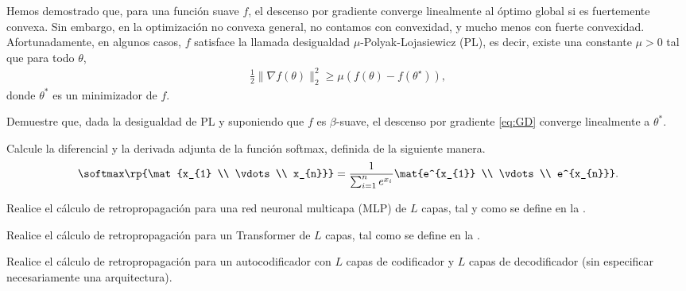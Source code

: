 \documentclass[../../book-main_es.tex]{subfiles}
\begin{document}
\begin{exercise}
    Hemos demostrado que, para una función suave $f$, el descenso por gradiente
    converge linealmente al óptimo global si es fuertemente
    convexa. Sin embargo, en la optimización no convexa general, no
    contamos con convexidad, y mucho menos con fuerte convexidad. Afortunadamente, en algunos
    casos, $f$ satisface la llamada desigualdad $\mu$-Polyak-Lojasiewicz (PL),
    es decir, existe una constante $\mu > 0$ tal que para
    todo $\theta$,
    \begin{align*}
        \frac{1}{2}\|\nabla f(\theta)\|_2^2 \ge \mu\left( f(\theta) -
        f(\theta^\star) \right),
    \end{align*}
    donde $\theta^*$ es un minimizador de $f$.

    Demuestre que, dada la desigualdad de PL y suponiendo que
    $f$ es $\beta$-suave, el descenso por gradiente \eqref{eq:GD} converge
    linealmente a  $\theta^*$.
\end{exercise}

\begin{exercise}
    Calcule la diferencial y la derivada adjunta de la función softmax,
    definida de la siguiente manera.
    \begin{equation}
        \softmax\rp{\mat{x_{1} \\ \vdots \\ x_{n}}} =
        \frac{1}{\sum_{i = 1}^{n}e^{x_{i}}}\mat{e^{x_{1}} \\ \vdots \\ e^{x_{n}}}.
    \end{equation}
\end{exercise}

\begin{exercise}
    Realice el cálculo de retropropagación para una red neuronal multicapa (MLP) de \(L\) capas,
    tal y como se define en la .
\end{exercise}

\begin{exercise}
    Realice el cálculo de retropropagación para un Transformer de \(L\) capas,
    tal como se define en la .
\end{exercise}

\begin{exercise}
    Realice el cálculo de retropropagación para un autocodificador
    con \(L\) capas de codificador y \(L\) capas de decodificador (sin
    especificar necesariamente una arquitectura).
\end{exercise}
\end{document}

